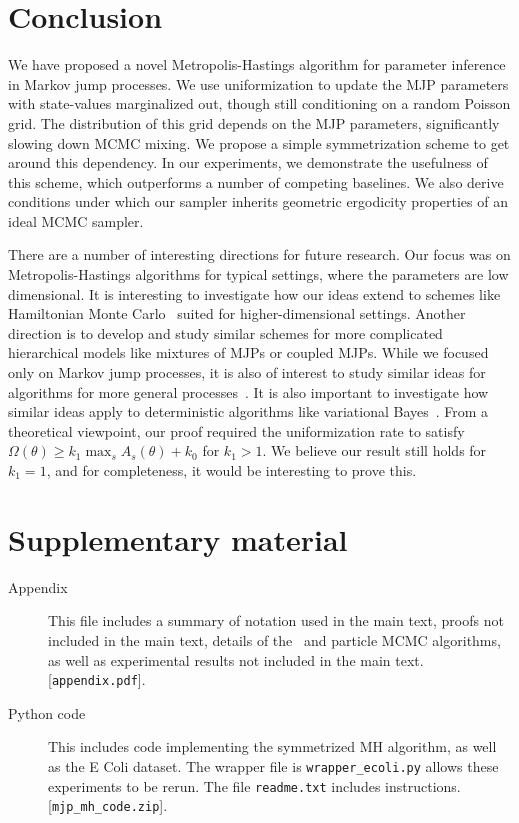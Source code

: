 \section{Conclusion}
We have proposed a novel Metropolis-Hastings algorithm for parameter 
inference in Markov jump processes. We use 
uniformization to update the MJP parameters with state-values marginalized 
out, though still conditioning on a random Poisson grid. The 
distribution of this grid depends on the MJP parameters, significantly 
slowing down MCMC mixing. We propose a simple symmetrization scheme to get 
around this dependency. In our experiments, we demonstrate the usefulness 
of this scheme, which outperforms a number of competing baselines.
We also derive conditions under which our sampler inherits geometric 
ergodicity properties of an ideal MCMC sampler.


There are a number of interesting directions for future research.
Our focus was on Metropolis-Hastings algorithms for typical settings,
where the parameters are low dimensional. It is interesting to 
investigate how our ideas extend to schemes like Hamiltonian Monte 
Carlo~\citep{Neal2010} suited for higher-dimensional settings. Another 
direction is to develop and study similar schemes for more complicated 
hierarchical models like mixtures of MJPs or coupled MJPs. While we 
focused only on Markov jump processes, it is also of interest to study 
similar ideas for algorithms for more general processes~\citep{RaoTeh12}. 
It is also important to investigate how similar ideas apply to 
deterministic algorithms like variational Bayes~\citep{OpperVarinf, panzharao17}. From 
a theoretical viewpoint, our proof required the uniformization rate to 
satisfy $\Omega(\theta) \ge k_1 \max_s A_s(\theta) + k_0$ for $k_1 > 1$. 
We believe our result still holds for $k_1 = 1$, and for completeness, 
it would be interesting to prove this.  


\section{Supplementary material}
\begin{description}
  \item[Appendix] This file includes a summary of notation used in the main text, proofs not included in the main text, details of the \naive\ and particle MCMC algorithms, as well as experimental results not included in the main text. [\texttt{appendix.pdf}]. 
\item[Python code] This includes code implementing the symmetrized MH algorithm, as well as the E Coli dataset.
  The wrapper file is {\texttt{wrapper\_ecoli.py}} allows these experiments to be rerun. The file {\texttt{readme.txt}} includes instructions.
 [\texttt{mjp\_mh\_code.zip}].
\end{description}
